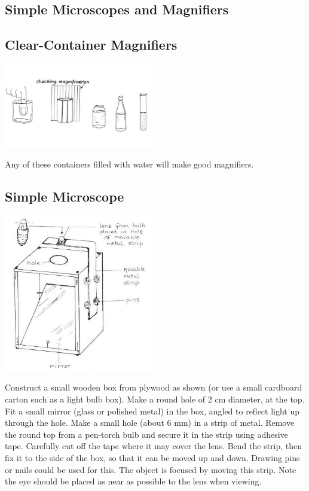 \begin{multicols}{2}

\section{Simple Microscopes and Magnifiers}

\subsection{Clear-Container Magnifiers}
\begin{center}
\includegraphics[width=0.49\textwidth]{./img/vso/container-microscope.jpg}
\end{center}

Any of these containers filled with water will make good magnifiers.

\subsection{Simple Microscope}
\begin{center}
\includegraphics[width=0.49\textwidth]{./img/source/simple-microscope.jpg}
\end{center}

Construct a small wooden box from plywood as
shown (or use a small cardboard carton such as
a light bulb box). Make a round hole of 2 cm
diameter, at the top. Fit a small mirror (glass or
polished metal) in the box, angled to reflect light
up through the hole. Make a small hole (about 6
mm) in a strip of metal. Remove the round top
from a pen-torch bulb and secure it in the strip
using adhesive tape. Carefully cut off the tape
where it may cover the lens. Bend the strip, then
fix it to the side of the box, so that it can be
moved up and down. Drawing pins or nails
could be used for this. The object is focused by
moving this strip. Note the eye should be placed
as near as possible to the lens when viewing.


\end{multicols}
